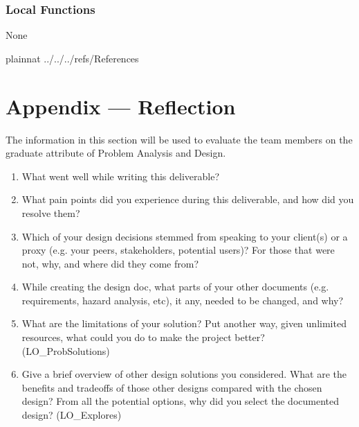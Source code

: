 \documentclass[12pt, titlepage]{article}
\begin{document}
\subsubsection{Local Functions}


None

\newpage

 {plainnat}
 {../../../refs/References}

\newpage



\newpage{}

\section*{Appendix --- Reflection}

The information in this section will be used to evaluate the team members on the
graduate attribute of Problem Analysis and Design.



\begin{enumerate}
  \item What went well while writing this deliverable? 
  \item What pain points did you experience during this deliverable, and how
    did you resolve them?
  \item Which of your design decisions stemmed from speaking to your client(s)
  or a proxy (e.g. your peers, stakeholders, potential users)? For those that
  were not, why, and where did they come from?
  \item While creating the design doc, what parts of your other documents (e.g.
  requirements, hazard analysis, etc), it any, needed to be changed, and why?
  \item What are the limitations of your solution?  Put another way, given
  unlimited resources, what could you do to make the project better? (LO\_ProbSolutions)
  \item Give a brief overview of other design solutions you considered.  What
  are the benefits and tradeoffs of those other designs compared with the chosen
  design?  From all the potential options, why did you select the documented design?
  (LO\_Explores)
\end{enumerate}
\end{document}
